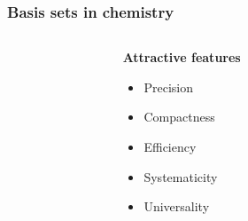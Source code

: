 \begin{frame}
    \frametitle{Basis sets in chemistry}
    \vspace{1.8mm}
    \begin{columns}
    \begin{column}{.10\textwidth}
    \end{column}
    \begin{column}{.30\textwidth}
    \textbf{Attractive features}
    \begin{itemize}
        \item Precision
        \item Compactness
        \item Efficiency
        \item Systematicity
        \item Universality
    \end{itemize}
    \end{column}
    \begin{column}{.60\textwidth}

    \vspace{5mm}

    \end{column}
    \end{columns}

    \vspace{40.2mm}

\end{frame}

